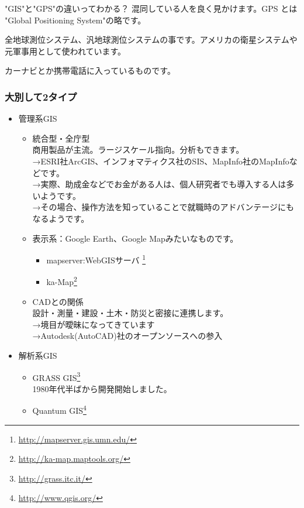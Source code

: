 \documentclass[mingoth,a4paper]{jsarticle}
\begin{document}
\begin{itembox}[c]{"GIS"と"GPS"の違いってわかる？}
混同している人を良く見かけます。GPS とは "Global Positioning System"の略です。

全地球測位システム、汎地球測位システムの事です。アメリカの衛星システムや元軍事用として使われています。

カーナビとか携帯電話に入っているものです。
\end{itembox}

\subsubsection{大別して2タイプ}
\begin{itemize}
 \item 管理系GIS
       \begin{itemize}
	\item 統合型・全庁型 \\
	      商用製品が主流。ラージスケール指向。分析もできます。\\
	      →ESRI社ArcGIS、インフォマティクス社のSIS、MapInfo社のMapInfoなどです。
	      \\
	      →実際、助成金などでお金がある人は、個人研究者でも導入する人は多
	      いようです。\\
	      →その場合、操作方法を知っていることで就職時のアドバンテージにもなるようです。
	\item 表示系：Google Earth、Google Mapみたいなものです。
	\begin{itemize}
	 \item mapserver:WebGISサーバ
	       \footnote{\url{http://mapserver.gis.umn.edu/}}
	 \item ka-Map\footnote{\url{http://ka-map.maptools.org/}}
	\end{itemize}
	\item CADとの関係\\
	      設計・測量・建設・土木・防災と密接に連携します。\\
	      →境目が曖昧になってきています\\
	      →Autodesk(AutoCAD)社のオープンソースへの参入
       \end{itemize}
 \item 解析系GIS
       \begin{itemize}
	\item GRASS GIS\footnote{\url{http://grass.itc.it/}}\\
	      1980年代半ばから開発開始しました。
	\item Quantum GIS\footnote{\url{http://www.qgis.org/}}\\

\end{itemize}
\end{itemize}
\end{document}
